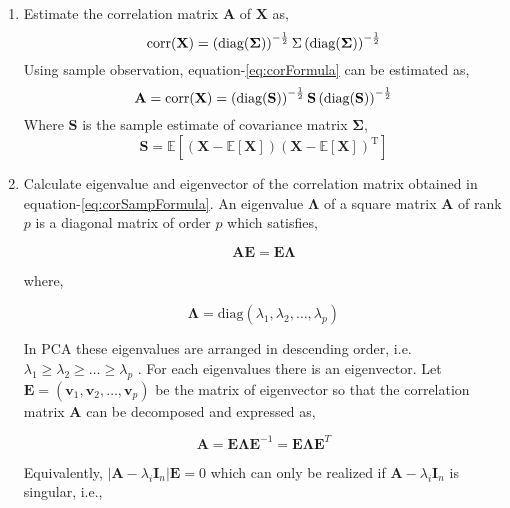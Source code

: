 \documentclass[12pt, lot, lof]{thesis}\usepackage[]{graphicx}\usepackage[]{color}
\newcommand{\bs}[1]{\ensuremath{\boldsymbol{#1}}}
\newcommand{\mbf}[1]{\ensuremath{\mathbf{#1}}}
\newcommand{\mbb}[1]{\ensuremath{\mathbb{#1}}}
\newcommand{\vl}[2]{\ensuremath{#1_1, #1_2, \ldots, #1_#2}}
\newcommand{\diag}[1]{\ifmmode \text{diag}(\mathbf{#1})\else diag($\mathbf{#1}$)\fi}
\newcommand{\corr}[1]{\ifmmode \text{corr}(\mathbf{#1})\else corr($\mathbf{#1}$)\fi}
\begin{document}
\begin{enumerate}
\item Estimate the correlation matrix $\bs{A}$ of $\bs{X}$ as,
    \begin{equation}
        \corr{\bs{X}}=\left(\diag{\Sigma}\right)^{-\frac{1}{2}}\Sigma\left(\diag{\Sigma}\right)^{-\frac{1}{2}}
        \label{eq:corFormula}
    \end{equation}
    Using sample observation, equation-\ref{eq:corFormula} can be estimated as,
    \begin{equation}
        \mbf{A}=\corr{\bs{X}}=\left(\diag{\mbf{S}}\right)^{-\frac{1}{2}}\mbf{S}\left(\diag{\mbf{S}}\right)^{-\frac{1}{2}}
        \label{eq:corSampFormula}
    \end{equation}
    Where \mbf{S} is the sample estimate of covariance matrix \bs{\Sigma},
    \begin{equation}
    	\mbf{S}=\mbb{E} \left[ \left( \mathbf{X} - \mbb{E}[\mathbf{X}] \right) \left( \mathbf{X} - \mbb{E}[\mathbf{X}] \right)^{\textrm{T}} \right] 
    \end{equation}

\item Calculate eigenvalue and eigenvector of the correlation matrix obtained in equation-\ref{eq:corSampFormula}. An eigenvalue $\mbf{\Lambda}$ of a square matrix $\mbf{A}$ of rank $p$ is a diagonal matrix of order $p$ which satisfies, 

  \begin{equation}
    \mbf{AE}=\mbf{E\Lambda}
    \label{eq:eigenEqn}
  \end{equation}
  
where,

\begin{equation}
\bs{\Lambda}=\text{diag}(\vl{\lambda}{p})
\label{eq:egnMatrix}
\end{equation}

In PCA these eigenvalues are arranged in descending order, i.e. $\lambda_1 \ge \lambda_2 \ge \ldots \ge \lambda_p$ . For each eigenvalues there is an eigenvector. Let $\mbf{E}=(\vl{\mbf{v}}{p})$ be the matrix of eigenvector so that the correlation matrix $\mbf{A}$ can be decomposed and expressed as,

\begin{equation}
  \mbf{A}=\mbf{E}\bs{\Lambda} \mbf{E}^{-1}=\mbf{E}\bs{\Lambda}\mbf{E}^T
  \label{eq:egnDecomp}
\end{equation}

Equivalently, $|\mbf{A}-\lambda_i \mbf{I}_n|\mbf{E}=0$ which can only be realized if $\mbf{A}-\lambda_i \mbf{I}_n$ is singular, i.e.,


\end{enumerate}
\end{document}
